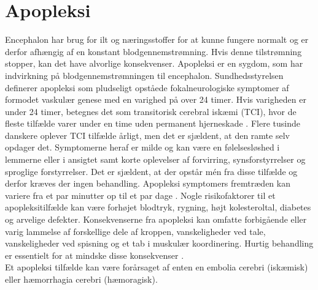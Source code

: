 \section{Apopleksi}
Encephalon har brug for ilt og næringsstoffer for at kunne fungere normalt og er derfor afhængig af en konstant blodgennemstrømning. Hvis denne tilstrømning stopper, kan det have alvorlige konsekvenser. \cite{Hjernesagen2015a} Apopleksi er en sygdom, som har indvirkning på blodgennemstrømningen til encephalon. Sundhedsstyrelsen definerer apopleksi som pludseligt opståede fokalneurologiske symptomer af formodet vaskulær genese med en varighed på over 24 timer. \cite{Sundhedsstyrelsen2009} Hvis varigheden er under 24 timer, betegnes det som transitorisk cerebral iskæmi (TCI), hvor de fleste tilfælde varer under en time uden permanent hjerneskade \cite{Sundhed.dk2014, Ritter2015}. Flere tusinde danskere oplever TCI tilfælde årligt, men det er sjældent, at den ramte selv opdager det. Symptomerne heraf er milde og kan være en følelsesløshed i lemmerne eller i ansigtet samt korte oplevelser af forvirring, synsforstyrrelser og sproglige forstyrrelser. Det er sjældent, at der opstår mén fra disse tilfælde og derfor kræves der ingen behandling. \cite{Academic2015, Hjernesagen2015a} 
Apopleksi symptomers fremtræden kan variere fra et par minutter op til et par dage \cite{Academic2015,Kruuse2014}. 
Nogle risikofaktorer til et apopleksitilfælde kan være forhøjet blodtryk, rygning, højt kolesteroltal, diabetes og arvelige defekter. Konsekvenserne fra apopleksi kan omfatte forbigående eller varig lammelse af forskellige dele af kroppen, %
vanskeligheder ved tale, vanskeligheder ved spisning og et tab i muskulær koordinering. \cite{Academic2015} Hurtig behandling er essentielt for at mindske disse konsekvenser \cite{Hjernesagen2015a}. \\ %
Et apopleksi tilfælde kan være forårsaget af enten en embolia cerebri (iskæmisk) eller hæmorrhagia cerebri (hæmoragisk). \cite{Ritter2015} 

